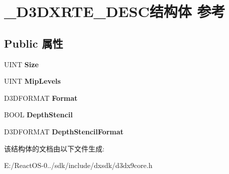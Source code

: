 \hypertarget{struct___d3_d_x_r_t_e___d_e_s_c}{}\section{\+\_\+\+D3\+D\+X\+R\+T\+E\+\_\+\+D\+E\+S\+C结构体 参考}
\label{struct___d3_d_x_r_t_e___d_e_s_c}
\subsection*{Public 属性}
\begin{DoxyCompactItemize}
\item 
\mbox{\label{struct___d3_d_x_r_t_e___d_e_s_c_a3ef841f9eb85d589f8bc2a32a54c4315}} 
U\+I\+NT {\bfseries Size}
\item 
\mbox{\label{struct___d3_d_x_r_t_e___d_e_s_c_a079350d1023e89eb9718c0b49368babe}} 
U\+I\+NT {\bfseries Mip\+Levels}
\item 
\mbox{\label{struct___d3_d_x_r_t_e___d_e_s_c_ae7a35152ddd953a42161ceac21bc8fb9}} 
D3\+D\+F\+O\+R\+M\+AT {\bfseries Format}
\item 
\mbox{\label{struct___d3_d_x_r_t_e___d_e_s_c_ab8e87cd6023c26e5463135886b9d6d40}} 
B\+O\+OL {\bfseries Depth\+Stencil}
\item 
\mbox{\label{struct___d3_d_x_r_t_e___d_e_s_c_ad2dcc64673ee65f589f3c49972473991}} 
D3\+D\+F\+O\+R\+M\+AT {\bfseries Depth\+Stencil\+Format}
\end{DoxyCompactItemize}


该结构体的文档由以下文件生成\+:\begin{DoxyCompactItemize}
\item 
E\+:/\+React\+O\+S-\/0../sdk/include/dxsdk/d3dx9core.\+h\end{DoxyCompactItemize}
